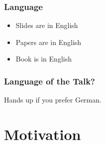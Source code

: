 

\date{6.3.2019}



\renewcommand{\enquote}[1]{\emph{``#1''}} %

\begin{frame}
	\titlepage
	\doclicenseThis
\end{frame}

\begin{frame}
	\frametitle{Language}
	\begin{itemize}
		\item Slides are in English
		\item Papers are in English
		\item Book is in English
	\end{itemize}
\end{frame}

\begin{assignment}
	\frametitle{Language of the Talk?}
	\begin{task}
	Hands up if you prefer German.
	\end{task}
\end{assignment}

\section{Motivation}

